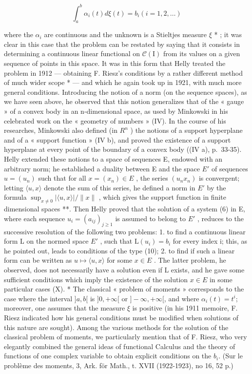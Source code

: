 \[
\int_ {a} ^ {b} \alpha_ {i} (t) d \xi (t) = b _ {i} (i = 1, 2, \dots)\tag{11}
\]

where the \(\alpha_{i}\) are continuous and the unknown is a Stieltjes measure \(\xi\) * ; it was clear in this case that the problem can be restated by saying that it consists in determining a continuous linear functional on \(\mathcal{C}(\mathrm{I})\) from its values on a given sequence of points in this space. It was in this form that Helly treated the problem in 1912 --- obtaining F. Riesz's conditions by a rather different method of much wider scope * --- and which he again took up in 1921, with much more general conditions. Introducing the notion of a norm (on the sequence spaces), as we have seen above, he observed that this notion generalizes that of the « gauge » of a convex body in an n-dimensional space, as used by Minkowski in his celebrated work on the « geometry of numbers » (IV). In the course of his researches, Minkowski also defined (in \(R^{n}\) ) the notions of a support hyperplane and of a « support function » (IV b), and proved the existence of a support hyperplane at every point of the boundary of a convex body ((IV a), p.~33-35). Helly extended these notions to a space of sequences E, endowed with an arbitrary norm; he established a duality between E and the space \(E'\) of sequences \(u = (u_{n})\) such that for all \(x = (x_{n}) \in E\) , the series \((u_{n}x_{n})\) is convergent; letting \(\langle u, x \rangle\) denote the sum of this series, he defined a norm in \(E'\) by the formula \(\sup_{x \neq 0} |\langle u, x \rangle| / \|x\|\) , which gives the support function in finite dimensional spaces **. Then Helly proved that the solution of a system (6) in E, where each sequence \(u_{i} = (a_{ij})_{j \geqslant 1}\) is assumed to belong to \(E'\) , reduces to the successive resolution of the following two problems: 1. to find a continuous linear form L on the normed space \(E'\) , such that \(\mathrm{L}(u_{i}) = b_{i}\) for every index i; this, as he pointed out, leads to conditions of the type (10); 2. to find if such a linear form can be written as \(u \mapsto \langle u, x \rangle\) for some \(x \in E\) . The latter problem, he observed, does not necessarily have a solution even if L exists, and he gave some sufficient conditions which imply the existence of the solution \(x \in E\) in some particular cases (X).
* The classical « problem of moments » corresponds to the case where the interval \(]a, b[\) is \(]0, +\infty[\) or \(]-\infty, +\infty[\), and where \(\alpha_{i}(t) = t^{i}\); moreover, one assumes that the measure \(\xi\) is positive (in his 1911 memoire, F. Riesz indicated how his general conditions must be modified when solutions of this nature are sought). Among the various methods for the solution of the classical problem of moments, we particularly mention that of F. Riesz, who very elegantly combined the general ideas of functional Calculus and the theory of functions of one complex variable to obtain explicit conditions on the \(b_{i}\). (Sur le problème des moments, 3, Ark. för Math., t. XVII (1922-1923), no 16, 52 p.)
